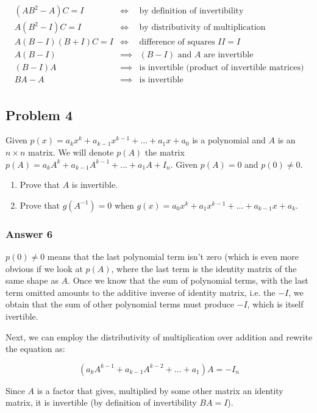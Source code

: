 \documentclass[11pt]{article}
\begin{document}
\begin{align*}
  (AB^2 - A)C = I & \iff & \textrm{by definition of invertibility} \\
  A(B^2 - I)C = I & \iff & \textrm{by distributivity of multiplication} \\
  A(B - I)(B + I)C = I & \iff & \textrm{difference of squares $II=I$} \\
  A(B - I) & \implies & \textrm{$(B - I)$ and $A$ are invertible} \\
  (B - I)A & \implies & \textrm{is invertible (product of invertible matrices)} \\
  BA - A & \implies & \textrm{is invertible} \\
\end{align*}
\subsection{Problem 4}
\label{sec-1-4}
Given $p(x)=a_kx^k+a_{k-1}x^{k-1}+...+a_1x+a_0$ is a polynomial and $A$ is
an $n\times n$ matrix. We will denote $p(A)$ the matrix
$p(A)=a_kA^k+a_{k-1}A^{k-1}+...+a_1A+I_n$. Given $p(A)=0$ and $p(0)\neq 0$.

\begin{enumerate}
\item Prove that $A$ is invertible.
\item Prove that $g(A^{-1})=0$ when $g(x)=a_0x^k+a_1x^{k-1}+...+a_{k-1}x+a_k$.
\end{enumerate}

\subsubsection{Answer 6}
\label{sec-1-4-1}
$p(0)\neq 0$ means that the last polynomial term isn't zero (which is even
more obvious if we look at $p(A)$, where the last term is the identity matrix
of the same shape as $A$.  Once we know that the sum of polynomial terms,
with the last term omitted amounts to the additive inverse of identity matrix,
i.e. the $-I$, we obtain that the sum of other polynomial terms must produce
$-I$, which is itself ivertible.

Next, we can employ the distributivity of multiplication over addition and
rewrite the equation as:

\begin{equation*}
  (a_kA^{k-1}+a_{k-1}A^{k-2}+...+a_1)A=-I_n
\end{equation*}

Since $A$ is a factor that gives, multiplied by some other matrix an identity
matrix, it is invertible (by definition of invertibility $BA=I$).
\end{document}
